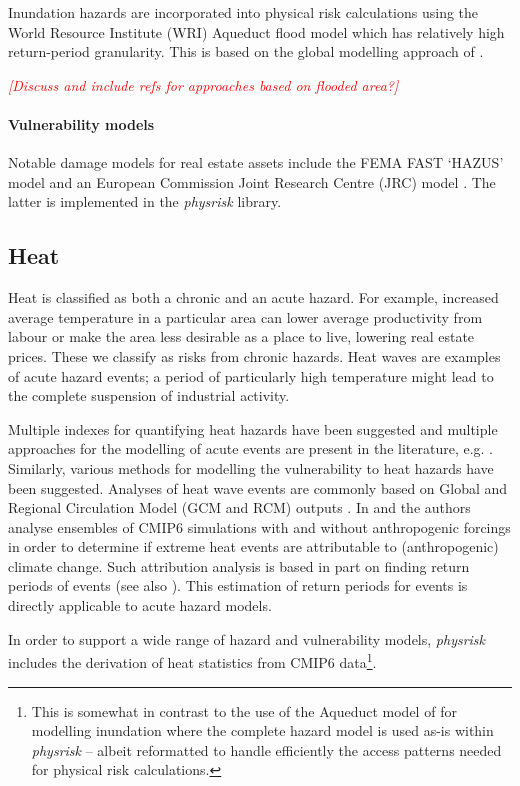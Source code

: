 \documentclass[a4paper,11pt]{extarticle} %
\begin{document}
{Inundation hazards are incorporated into physical risk calculations using the World Resource Institute (WRI) Aqueduct flood model \cite{WardEtAl:2020} which has relatively high return-period granularity. This is based on the global modelling approach of \cite{WardEtAl:2013}.

{\textcolor{red}{\emph{[Discuss and include refs for approaches based on flooded area?]}}}

\paragraph{Vulnerability models}
Notable damage models for real estate assets include the FEMA FAST `HAZUS' model \cite{ScawthornEtAl:2006} and an European Commission Joint Research Centre (JRC) model \cite{HuizingaEtAl:2017}. The latter is implemented in the \emph{physrisk} library. 
 

\subsection{Heat}

Heat is classified as both a chronic and an acute hazard.  For example, increased average temperature in a particular area can lower average productivity from labour or make the area less desirable as a place to live, lowering real estate prices. These we classify as risks from chronic hazards. Heat waves are examples of acute hazard events; a period of particularly high temperature might lead to the complete suspension of industrial activity.

Multiple indexes for quantifying heat hazards have been suggested and multiple approaches for the modelling of acute events are present in the literature, e.g. \cite{MazdiyasniEtAl:2019}. Similarly, various methods for modelling the vulnerability to heat hazards have been suggested. Analyses of heat wave events are commonly based on Global and Regional Circulation Model (GCM and RCM) outputs \cite{DosioEtAl:2018}. In \cite{Christidis:2021} and \cite{Christidis:2013} the authors analyse ensembles of CMIP6 simulations with and without anthropogenic forcings in order to determine if extreme heat events are attributable to (anthropogenic) climate change. Such attribution analysis is based in part on finding return periods of events (see also \cite{StottEtAl:2016}). This estimation of return periods for events is directly applicable to acute hazard models.  

In order to support a wide range of hazard and vulnerability models,  \emph{physrisk} includes the derivation of heat statistics from CMIP6 data\footnote{This is somewhat in contrast to the use of the Aqueduct model of \cite{WardEtAl:2020} for modelling inundation where the complete hazard model is used as-is within \emph{physrisk} -- albeit reformatted to handle efficiently the access patterns needed for physical risk calculations.}. 

}
\end{document}
